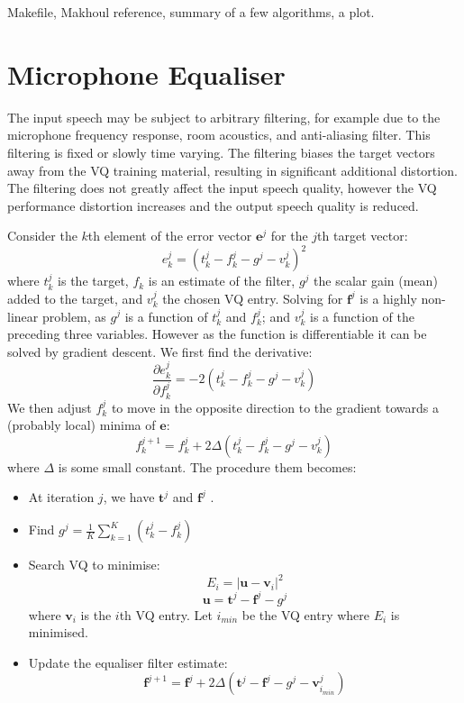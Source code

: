 \documentclass{article}
\begin{document}
Makefile, Makhoul reference, summary of a few algorithms, a plot.

\section{Microphone Equaliser}

The input speech may be subject to arbitrary filtering, for example due to the microphone frequency response, room acoustics, and anti-aliasing filter.  This filtering is fixed or slowly time varying.  The filtering biases the target vectors away from the VQ training material, resulting in significant additional distortion.  The filtering does not greatly affect the input speech quality, however the VQ performance distortion increases and the output speech quality is reduced.

Consider the $k$th element of the error vector $\mathbf{e}^j$ for the $j$th target vector:
\begin{equation}
e_k^j=(t_k^j - f_k^j -g^j - v_k^j)^2
\end{equation}
where $t_k^j$ is the target, $f_k$ is an estimate of the filter, $g^j$ the scalar gain (mean) added to the target, and $v_k^j$ the chosen VQ entry.  Solving for $\mathbf{f}^j$ is a highly non-linear problem, as $g^j$ is a function of $t_k^j$ and $f_k^j$; and $v_k^j$ is a function of the preceding three variables.  However as the function is differentiable it can be solved by gradient descent.  We first find the derivative:
\begin{equation}
\frac{\partial e_k^j}{\partial f_k^j} = -2(t_k^j - f_k^j -g^j - v_k^j)
\end{equation}
We then adjust $f_k^j$ to move in the opposite direction to the gradient towards a (probably local) minima of $\mathbf{e}$:
\begin{equation}
f_k^{j+1} = f_k^j + 2 \Delta (t_k^j - f_k^j -g^j - v_k^j)
\end{equation}
where $\Delta$ is some small constant.  The procedure them becomes:
\begin{itemize}
\item At iteration $j$, we have $\mathbf{t}^j$ and $\mathbf{f}^j$ .
\item Find $g^j = \frac{1}{K} \sum_{k=1}^K(t_k^j - f_k^j)$
\item Search VQ to minimise:
\begin{equation}
E_i=|\mathbf{u}-\mathbf{v}_i|^2
\end{equation}
\begin{equation}
\mathbf{u} = \mathbf{t}^j - \mathbf{f}^j -g^j
\end{equation}
where $\mathbf{v}_i$ is the $i$th VQ entry. Let $i_{min}$ be the VQ entry where $E_i$ is minimised.
\item Update the equaliser filter estimate:
\begin{equation}
\mathbf{f}^{j+1} = \mathbf{f}^j + 2 \Delta (\mathbf{t}^j - \mathbf{f}^j - g^j - \mathbf{v}_{i_{min}}^j)
\end{equation}
\end{itemize}
\end{document}
